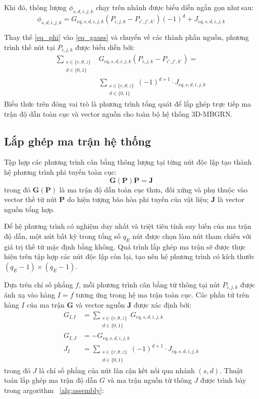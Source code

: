 Khi đó, thông lượng $\phi_{s,d,i,j,k}$ chạy trên nhánh được biểu diễn ngắn gọn như sau:
\begin{equation}
    \phi_{s,d,i,j,k} = G_{eq,s,d,i,j,k} (P_{i,j,k} - P_{i',j',k'})(-1)^d + J_{eq,s,d,i,j,k}
    \label{eq_phi}
\end{equation}

Thay thế \eqref{eq_phi} vào \eqref{eq_gauss} và chuyển vế các thành phần nguồn, phương trình thế nút tại $P_{i,j,k}$ được biểu diễn bởi:
\begin{equation}
\begin{aligned}
    \sum_{\substack{s \in \{r, \theta, z\} \\ d \in \{0, 1\}}} & G_{eq,s,d,i,j,k} (P_{i,j,k} - P_{i',j',k'}) = \\
    & \sum_{\substack{s \in \{r, \theta, z\} \\ d \in \{0, 1\}}} (-1)^{d+1} \cdot J_{eq,s,d,i,j,k}
\end{aligned}
\label{eq_global}
\end{equation}
Biểu thức trên đóng vai trò là phương trình tổng quát để lắp ghép trực tiếp ma trận độ dẫn toàn cục và vector nguồn cho toàn bộ hệ thống 3D-MBGRN.

\subsection{Lắp ghép ma trận hệ thống}

Tập hợp các phương trình cân bằng thông lượng tại từng nút độc lập tạo thành hệ phương trình phi tuyến toàn cục:
\begin{equation}
    \mathbf{G}(\mathbf{P}) \mathbf{P} = \mathbf{J}
\end{equation}
trong đó $\mathbf{G}(\mathbf{P})$ là ma trận độ dẫn toàn cục thưa, đối xứng và phụ thuộc vào vector thế từ nút $\mathbf{P}$ do hiện tượng bão hòa phi tuyến của vật liệu; $\mathbf{J}$ là vector nguồn tổng hợp.

Để hệ phương trình có nghiệm duy nhất và triệt tiêu tính suy biến của ma trận độ dẫn, một nút bất kỳ trong tổng số $q_E$ nút được chọn làm nút tham chiếu với giá trị thế từ mặc định bằng không. Quá trình lắp ghép ma trận sẽ được thực hiện trên tập hợp các nút độc lập còn lại, tạo nên hệ phương trình có kích thước $(q_E - 1) \times (q_E - 1)$.

Dựa trên chỉ số phẳng $f$, mỗi phương trình cân bằng từ thông tại nút $P_{i,j,k}$ được ánh xạ vào hàng $I = f$ tương ứng trong hệ ma trận toàn cục. Các phần tử trên hàng $I$ của ma trận $\mathbf{G}$ và vector nguồn $\mathbf{J}$ được xác định bởi:
\begin{align}
    G_{I,I} &= \sum_{\substack{s \in \{r, \theta, z\} \\ d \in \{0, 1\}}} G_{eq,s,d,i,j,k} \\
    G_{I,J} &= -G_{eq,s,d,i,j,k} \\
    J_I &= \sum_{\substack{s \in \{r, \theta, z\} \\ d \in \{0, 1\}}} (-1)^{d+1} \cdot J_{eq,s,d,i,j,k}
\end{align}
trong đó $J$ là chỉ số phẳng của nút lân cận kết nối qua nhánh $(s, d)$. Thuật toán lắp ghép ma trận độ dẫn $G$ và ma trận nguồn từ thông $J$ được trình bày trong argorithm ~\ref{alg:assembly}:


